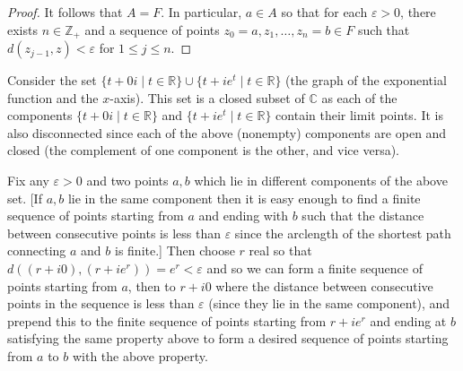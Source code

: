 \documentclass[12pt]{amsart}
\begin{document}
\begin{proof}
It follows that $A = F$. In particular, $a\in A$ so that for each $\varepsilon>0$, there exists $n\in \mathbb{Z}_+$ and a sequence of points $z_0 = a, z_1,\dots,z_n = b\in F$ such that $d(z_{j-1},z)<\varepsilon$ for $1\leq j \leq n$.
\end{proof}

Consider the set $\{t+0i\mid t\in\mathbb{R}\}\cup\{t+ie^{t}\mid t\in\mathbb{R}\}$ (the graph of the exponential function and the $x$-axis). This set is a closed subset of $\mathbb{C}$ as each of the components $\{t+0i\mid t\in\mathbb{R}\}$ and $\{t+ie^{t}\mid t\in\mathbb{R}\}$ contain their limit points. It is also disconnected since each of the above (nonempty) components are open and closed (the complement of one component is the other, and vice versa). 

Fix any $\varepsilon>0$ and two points $a,b$ which lie in different components of the above set. [If $a,b$ lie in the same component then it is easy enough to find a finite sequence of points starting from $a$ and ending with $b$ such that the distance between consecutive points is less than $\varepsilon$ since the arclength of the shortest path connecting $a$ and $b$ is finite.] Then choose $r$ real so that $d((r+i0),(r+ie^r)) = e^r < \varepsilon$ and so we can form a finite sequence of points starting from $a$, then to $r+i0$ where the distance between consecutive points in the sequence is less than $\varepsilon$ (since they lie in the same component), and prepend this to the finite sequence of points starting from $r+ie^r$ and ending at $b$ satisfying the same property above to form a desired sequence of points starting from $a$ to $b$ with the above property. 
\end{document}
